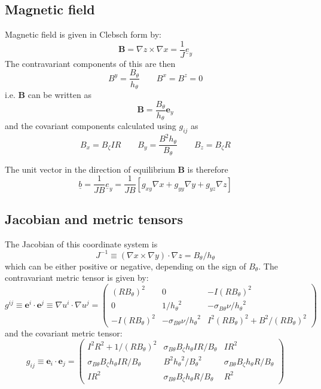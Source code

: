 \documentclass[12pt]{article}
\newcommand{\sbt}{\ensuremath{\sigma_{B\theta}}}
\newcommand{\hthe}{\ensuremath{h_\theta}}
\newcommand{\Bp}{\ensuremath{B_\theta}}
\newcommand{\Bt}{\ensuremath{B_\zeta}}
\newcommand{\Vec}[1]{\ensuremath{\mathbf{#1}}}
\newcommand{\Bvec}{\Vec{B}}
\newcommand{\rbp}{\ensuremath{R\Bp}}
\newcommand{\rbpsq}{\ensuremath{\left(\rbp\right)^2}}
\begin{document}
\subsection{Magnetic field}

Magnetic field is given in Clebsch form by:
\[
\mathbf{B} = \nabla z\times \nabla x = \frac{1}{J}\underline{e}_y
\]
The contravariant components of this are then
\begin{equation}
B^y = \frac{\Bp}{\hthe} \qquad B^x = B^z = 0
\label{eq:B_contravariant}
\end{equation}
i.e. $\Bvec$ can be written as
\begin{equation}
\Bvec = \frac{\Bp}{\hthe}\mathbf{e}_y
\label{eq:Bvec_cont}
\end{equation}
and the covariant components calculated using $g_{ij}$ as
\begin{equation}
B_x = \Bt I R \qquad B_y = \frac{B^2 \hthe}{\Bp} \qquad B_z = \Bt R
\label{eq:B_covariant}
\end{equation}

The unit vector in the direction of equilibrium $\Bvec$ is therefore
\[
\underline{b} = \frac{1}{JB}\underline{e}_y = \frac{1}{JB}\left[g_{xy}\nabla x + g_{yy}\nabla y + g_{yz}\nabla z\right]
\]

\subsection{Jacobian and metric tensors}

The Jacobian of this coordinate system is
\[
J^{-1} \equiv \left(\nabla x\times\nabla y\right)\cdot\nabla z = \Bp / \hthe
\]
which can be either positive or negative, depending on the sign of $\Bp$.
The contravariant metric tensor is given by:
\[
g^{ij} \equiv \Vec{e}^i \cdot\Vec{e}^j \equiv \nabla u^i \cdot \nabla u^j = \left(\begin{array}{ccc}
\left(R\Bp\right)^2 & 0 & -I\left(R\Bp\right)^2 \\
0 & 1 / \hthe^2 & -\sbt\nu / \hthe^2 \\
-I\left(R\Bp\right)^2 & -\sbt\nu / \hthe^2 & I^2\left(R\Bp\right)^2 + B^2 / \left(R\Bp\right)^2 \end{array} \right)
\]
and the covariant metric tensor:
\[
g_{ij} \equiv \Vec{e}_i \cdot\Vec{e}_j = \left(\begin{array}{ccc}
I^2 R^2 + 1 / \rbpsq & \sbt\Bt\hthe I R / \Bp & I R^2 \\
\sbt\Bt\hthe I R / \Bp & B^2\hthe^2 / \Bp^2 & \sbt\Bt\hthe R / \Bp \\
I R^2 & \sbt\Bt\hthe R / \Bp & R^2 \end{array} \right)
\]
\end{document}

